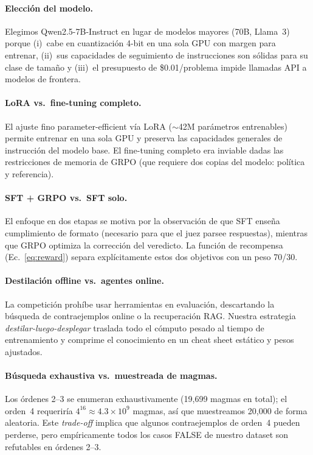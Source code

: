 \documentclass{article}
\begin{document}
\paragraph{Elecci\'on del modelo.} Elegimos Qwen2.5-7B-Instruct en lugar de modelos mayores (70B, Llama~3) porque (i)~cabe en cuantizaci\'on 4-bit en una sola GPU con margen para entrenar, (ii)~sus capacidades de seguimiento de instrucciones son s\'olidas para su clase de tama\~no y (iii)~el presupuesto de \$0.01/problema impide llamadas API a modelos de frontera.

\paragraph{LoRA vs.\ fine-tuning completo.} El ajuste fino parameter-efficient v\'ia LoRA ($\sim$42M par\'ametros entrenables) permite entrenar en una sola GPU y preserva las capacidades generales de instrucci\'on del modelo base. El fine-tuning completo era inviable dadas las restricciones de memoria de GRPO (que requiere dos copias del modelo: pol\'itica y referencia).

\paragraph{SFT + GRPO vs.\ SFT solo.} El enfoque en dos etapas se motiva por la observaci\'on de que SFT ense\~na cumplimiento de formato (necesario para que el juez parsee respuestas), mientras que GRPO optimiza la correcci\'on del veredicto. La funci\'on de recompensa (Ec.~\ref{eq:reward}) separa expl\'icitamente estos dos objetivos con un peso 70/30.

\paragraph{Destilaci\'on offline vs.\ agentes online.} La competici\'on proh\'ibe usar herramientas en evaluaci\'on, descartando la b\'usqueda de contraejemplos online o la recuperaci\'on RAG. Nuestra estrategia \textit{destilar-luego-desplegar} traslada todo el c\'omputo pesado al tiempo de entrenamiento y comprime el conocimiento en un cheat sheet est\'atico y pesos ajustados.

\paragraph{B\'usqueda exhaustiva vs.\ muestreada de magmas.} Los \'ordenes 2--3 se enumeran exhaustivamente (19{,}699 magmas en total); el orden~4 requerir\'ia $4^{16} \approx 4.3 \times 10^9$ magmas, as\'i que muestreamos 20{,}000 de forma aleatoria. Este \textit{trade-off} implica que algunos contraejemplos de orden~4 pueden perderse, pero emp\'iricamente todos los casos FALSE de nuestro dataset son refutables en \'ordenes 2--3.
\end{document}
